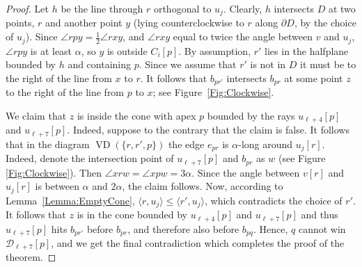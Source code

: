 \documentclass[letter,11pt]{article}
\def\dirtour{{\mathcal D}}
\def\inprod#1#2{\langle #1, #2\rangle}
\def\bisect{b}
\def\VD{\mathop{\mathrm{VD}}}
\begin{document}
\begin{proof}
Let $h$ be the line through $r$ orthogonal to $u_j$.  
Clearly, $h$ intersects $D$ at two points, $r$ and another point
$y$ (lying counterclockwise to $r$ along $\partial D$, by the choice of $u_j$). Since $\angle rpy=\frac{1}{2}\angle rxy$, and $\angle rxy$ equal to twice the angle between $v$ and $u_j$, $\angle rpy$ is at least $\alpha$,
 so $y$ is outside $C_i[p]$.  By assumption, $r'$ lies in the halfplane bounded by $h$ and containing $p$. Since we assume that $r'$
is not in $D$ it must be to the right of the  line
from $x$ to $r$.  It follows that $b_{pr'}$ intersects $b_{pr}$ at
some point $z$ to the right of the  line from $p$ to $x$; see
Figure~\ref{Fig:Clockwise}.


We claim that $z$ is inside the cone with apex $p$ bounded by the rays
$u_{\ell+4}[p]$ and $u_{\ell+7}[p]$. 
Indeed, suppose to the contrary that the claim is false.
It follows that in the diagram $\VD(\{r,r',p\})$ the edge
$e_{pr}$ is $\alpha$-long around $u_j[r]$. Indeed, denote the intersection point of $u_{\ell+7}[p]$ and $\bisect_{pr}$ as $w$ (see Figure \ref{Fig:Clockwise}). Then $\angle xrw=\angle xpw= 3\alpha$. Since the angle between $v[r]$ and $u_j[r]$ is between $\alpha$ and $2\alpha$, the claim follows. Now, according to
Lemma~\ref{Lemma:EmptyCone}, $\inprod{r}{u_j}\leq\inprod{r'}{u_j}$,
which contradicts the choice of $r'$. It follows that $z$ is in
the cone bounded by $u_{\ell+4}[p]$ and $u_{\ell+7}[p]$ and thus
$u_{\ell+7}[p]$ hits $b_{pr'}$ before $b_{pr}$, and therefore also before $\bisect_{pq}$. Hence, $q$ cannot win $\dirtour_{\ell+7}[p]$, and we get the final contradiction which completes the proof of the theorem.
\end{proof}
\end{document}
